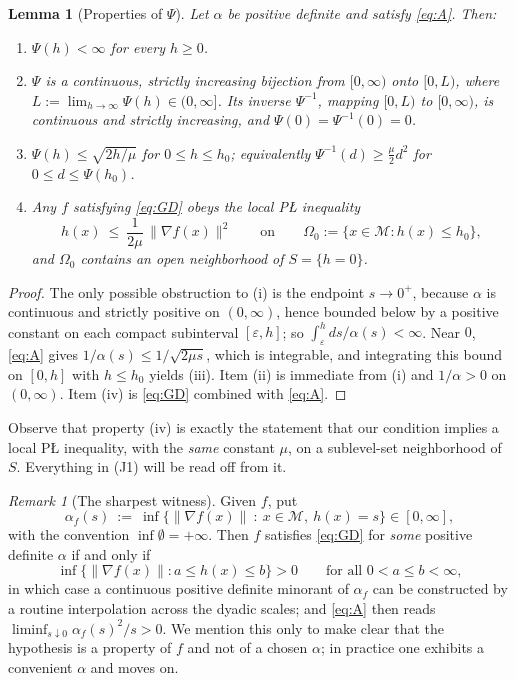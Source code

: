 \documentclass[11pt]{article}
\theoremstyle{plain}
\newtheorem{lem}[thm]{Lemma}
\theoremstyle{definition}
\theoremstyle{remark}
\newtheorem{rem}[thm]{Remark}
\newcommand{\M}{\mathcal{M}}
\begin{document}
\begin{lem}[Properties of $\Psi$]\label{lem:Psi}
Let $\alpha$ be positive definite and satisfy \eqref{eq:A}. Then:
\begin{enumerate}
\item[(i)] $\Psi(h) < \infty$ for every $h \ge 0$.
\item[(ii)] $\Psi$ is a continuous, strictly increasing bijection from $[0,\infty)$
onto $[0,L)$, where $L := \lim_{h\to\infty}\Psi(h) \in (0,\infty]$. Its
inverse $\Psi^{-1}$, mapping $[0,L)$ to $[0,\infty)$, is continuous and
strictly increasing, and $\Psi(0)=\Psi^{-1}(0)=0$.
\item[(iii)] $\Psi(h) \le \sqrt{2h/\mu}$ for $0 \le h \le h_0$; equivalently
$\Psi^{-1}(d) \ge \tfrac{\mu}{2}d^2$ for $0 \le d \le \Psi(h_0)$.
\item[(iv)] Any $f$ satisfying \eqref{eq:GD} obeys the \emph{local} P\L{} inequality
\[
  h(x) \ \le\ \frac{1}{2\mu}\,\|\nabla f(x)\|^2
  \qquad\text{on}\qquad \Omega_0 := \{x\in\M : h(x) \le h_0\} ,
\]
and $\Omega_0$ contains an open neighborhood of $S = \{h = 0\}$.
\end{enumerate}
\end{lem}

\begin{proof}
The only possible obstruction to (i) is the endpoint $s\to 0^+$, because $\alpha$
is continuous and strictly positive on $(0,\infty)$, hence bounded below by a
positive constant on each compact subinterval $[\varepsilon, h]$; so
$\int_\varepsilon^h ds/\alpha(s) < \infty$. Near $0$, \eqref{eq:A} gives
$1/\alpha(s) \le 1/\sqrt{2\mu s}$, which is integrable, and integrating this
bound on $[0,h]$ with $h\le h_0$ yields (iii). Item (ii) is immediate from
(i) and $1/\alpha > 0$ on $(0,\infty)$. Item (iv) is \eqref{eq:GD} combined
with \eqref{eq:A}.
\end{proof}

Observe that property (iv) is exactly the statement that our condition
implies a local P\L{} inequality, with the \emph{same} constant $\mu$, on a
sublevel-set neighborhood of $S$. Everything in (J1) will be read off from it.

\begin{rem}[The sharpest witness]\label{rem:sharpest}
Given $f$, put
\[
  \alpha_f(s) \ :=\ \inf\bigl\{ \|\nabla f(x)\| \ :\ x\in\M,\ h(x) = s \bigr\}
  \in [0,\infty] ,
\]
with the convention $\inf\emptyset = +\infty$. Then $f$ satisfies \eqref{eq:GD}
for \emph{some} positive definite $\alpha$ if and only if
\[
  \inf\bigl\{\|\nabla f(x)\| : a \le h(x) \le b\bigr\} > 0
  \qquad \text{for all } 0 < a \le b < \infty ,
\]
in which case a continuous positive definite minorant of $\alpha_f$ can be
constructed by a routine interpolation across the dyadic scales; and
\eqref{eq:A} then reads $\liminf_{s\downarrow 0}\alpha_f(s)^2/s > 0$. We mention
this only to make clear that the hypothesis is a property of $f$ and not of a
chosen $\alpha$; in practice one exhibits a convenient $\alpha$ and moves on.
\end{rem}
\end{document}
